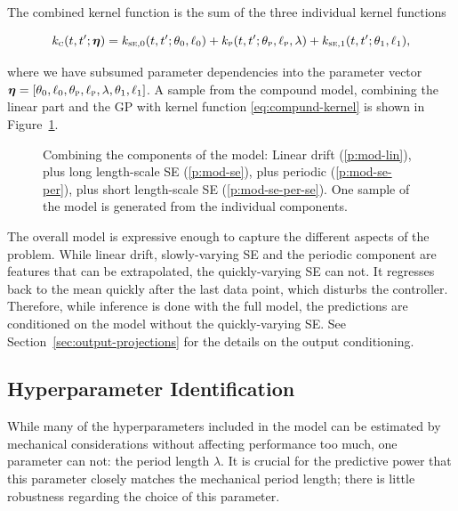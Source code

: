 The combined kernel function is the sum of the three individual kernel functions
\begin{fullwidth}\vspace{-\baselineskip}
\begin{equation}
  \label{eq:compund-kernel}
  \k_\mathsc{c}(t,t';\boldsymbol{\eta}) =
\k_{\mathsc{se},0}(t,t';\theta_0,\ell_0) +
\k_\mathsc{p}(t,t';\theta_\mathsc{p},\ell_\mathsc{p},\lambda) +
\k_{\mathsc{se},1}(t,t';\theta_1,\ell_1),
\end{equation}
\end{fullwidth}
where we have subsumed parameter dependencies into the parameter vector
$\boldsymbol{\eta}=[\theta_0, \ell_0, \theta_{\normalfont\textsc{p}},\ell_{\normalfont\textsc{p}},
\lambda, \theta_1, \ell_1]$.
A sample from the compound model, combining the linear part and the GP with
kernel function \eqref{eq:compund-kernel} is shown in
Figure~\ref{fig:model-components}.

\begin{figure}
\footnotesize%
\setlength{\figurewidth}{\textwidth}%
\setlength{\figureheight}{0.6\textwidth}%
%
\caption[Combining the components of the model.]{Combining the components
of the model: Linear drift (\ref*{p:mod-lin}), plus long
length-scale SE (\ref*{p:mod-se}), plus periodic (\ref*{p:mod-se-per}), plus
short length-scale SE (\ref*{p:mod-se-per-se}). One sample of the model is
generated from the individual components.}
\label{fig:model-components}
\end{figure}

The overall model is expressive enough to capture the different aspects of
the problem. While linear drift, slowly-varying SE and the periodic
component are features that can be extrapolated, the quickly-varying SE can not.
It regresses back to the mean quickly after the last data point,
which disturbs the controller. Therefore, while inference is done with the
full model, the predictions are conditioned on the model without the
quickly-varying SE. See Section~\ref{sec:output-projections} for the
details on the output conditioning.

\subsection{Hyperparameter Identification}

While many of the hyperparameters included in the model can be estimated by
mechanical considerations without affecting performance too much, one
parameter can not: the period length $\lambda$. It is crucial for the predictive
power that this parameter closely matches the mechanical period length; there
is little robustness regarding the choice of this parameter.

